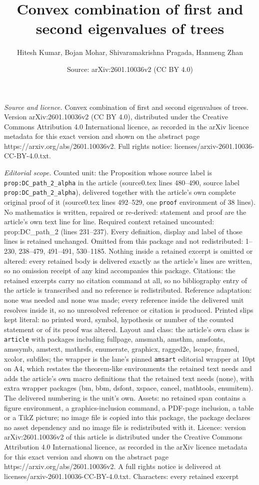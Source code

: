\documentclass[10pt,a4paper]{amsart}
\title[Convex combination of first and second eigenvalues of trees]{Convex combination of first and second eigenvalues of trees}
\author{Hitesh Kumar, Bojan Mohar, Shivaramakrishna Pragada, Hanmeng Zhan}
\date{Source: arXiv:2601.10036v2 (CC BY 4.0)}
\begin{document}
\maketitle

\noindent\emph{Source and licence.} Convex combination of first and second eigenvalues of trees. Version arXiv:2601.10036v2 (CC BY 4.0), distributed under the Creative Commons Attribution 4.0 International licence, as recorded in the arXiv licence metadata for this exact version and shown on the abstract page https://arxiv.org/abs/2601.10036v2. Full rights notice: licenses/arxiv-2601.10036-CC-BY-4.0.txt.\par\smallskip

\noindent\textit{Editorial scope.} Counted unit: the Proposition whose source label is \texttt{prop:DC\_path\_2\_alpha} in the article (source0.tex lines 480--490, source label \texttt{prop:DC\_path\_2\_alpha}), delivered together with the article's own complete original proof of it (source0.tex lines 492--529, one \texttt{proof} environment of 38 lines). No mathematics is written, repaired or re-derived: statement and proof are the article's own text line for line. Required context retained uncounted: prop:DC\_path\_2 (lines 231--237). Every definition, display and label of those lines is retained unchanged. Omitted from this package and not redistributed: 1--230, 238--479, 491--491, 530--1185. Nothing inside a retained excerpt is omitted or altered: every retained body is delivered exactly as the article's lines are written, so no omission receipt of any kind accompanies this package. Citations: the retained excerpts carry no citation command at all, so no bibliography entry of the article is transcribed and no reference is redistributed. Reference adaptation: none was needed and none was made; every reference inside the delivered unit resolves inside it, so no unresolved reference or citation is produced. Printed slips kept literal: no printed word, symbol, hypothesis or number of the counted statement or of its proof was altered. Layout and class: the article's own class is \texttt{article} with packages including fullpage, amsmath, amsthm, amsfonts, amssymb, amstext, mathrsfs, enumerate, graphicx, ragged2e, lscape, framed, xcolor, subfiles; the wrapper is the lane's pinned \texttt{amsart} editorial wrapper at 10pt on A4, which restates the theorem-like environments the retained text needs and adds the article's own macro definitions that the retained text needs (none), with extra wrapper packages (bm, bbm, dsfont, xspace, cancel, mathtools, enumitem). The delivered numbering is the unit's own. Assets: no retained span contains a figure environment, a graphics-inclusion command, a PDF-page inclusion, a table or a TikZ picture; no image file is copied into this package, the package declares no asset dependency and no image file is redistributed with it. Licence: version arXiv:2601.10036v2 of this article is distributed under the Creative Commons Attribution 4.0 International licence, as recorded in the arXiv licence metadata for this exact version and shown on the abstract page https://arxiv.org/abs/2601.10036v2. A full rights notice is delivered at licenses/arxiv-2601.10036-CC-BY-4.0.txt. Characters: every retained excerpt 
\end{document}
